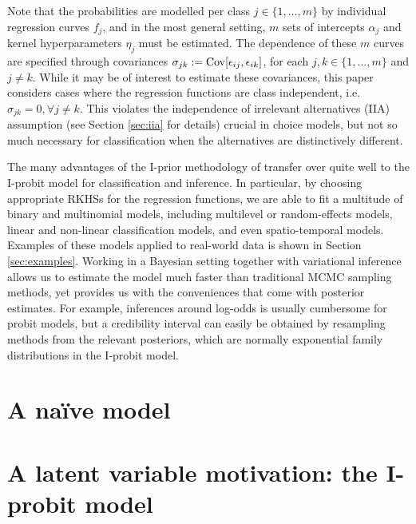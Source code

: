 \documentclass[a4paper,showframe,11pt]{report}
\begin{document}
Note that the probabilities are modelled per class $j\in\{1,\dots,m\}$ by individual regression curves $f_j$, and in the most general setting, $m$ sets of intercepts $\alpha_j$ and kernel hyperparameters $\eta_j$ must be estimated.
The dependence of these $m$ curves are specified through covariances $\sigma_{jk} := \operatorname{Cov}[\epsilon_{ij}, \epsilon_{ik}]$, 
for each $j,k\in\{1,\dots,m\}$ and $j\neq k$.
While it may be of interest to estimate these covariances, this paper considers cases where the regression functions are class independent, i.e. $\sigma_{jk} = 0,\forall j \neq k$.
This violates the independence of irrelevant alternatives (IIA) assumption (see Section \ref{sec:iia} for details) crucial in choice models, but not so much necessary for classification when the alternatives are distinctively different.



The many advantages of the I-prior methodology of \cite{jamil2017} transfer over quite well to the I-probit model for classification and inference.
In particular, by choosing appropriate RKHSs for the regression functions, we are able to fit a multitude of binary and multinomial models, including multilevel or random-effects models, linear and non-linear classification models, and even spatio-temporal models.
Examples of these models applied to real-world data is shown in Section \ref{sec:examples}.
Working in a Bayesian setting together with variational inference allows us to estimate the model much faster than traditional MCMC sampling methods, yet provides us with the conveniences that come with posterior estimates.
For example, inferences around log-odds is usually cumbersome for probit models, but a credibility interval can easily be obtained by resampling methods from the relevant posteriors, which are normally exponential family distributions in the I-probit model.


\newpage
\section{A naïve model}
%

\section{A latent variable motivation: the I-probit model}
%
\end{document}
